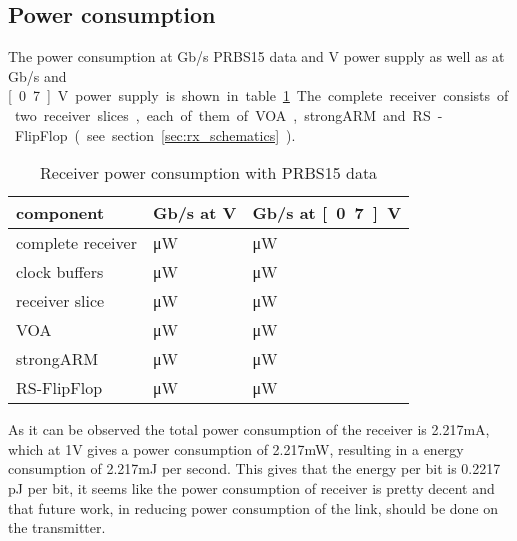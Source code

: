 \subsection{Power consumption}
The power consumption at \unit[10]{Gb/s} PRBS15 data and \unit[1]{V} power supply as well as at \unit[2]{Gb/s} and \unit[0.7]{V} power supply is shown in table \ref{tab:power_consumption_rx}. The complete receiver consists of two receiver slices, each of them of VOA, strongARM and RS-FlipFlop (see section \ref{sec:rx_schematics}).

\begin{table}[H] %
  \centering
  \begin{tabular}{l|l|l}
    component & \unit[10]{Gb/s} at \unit[1]{V} & \unit[2]{Gb/s} at \unit[0.7]{V}\\
    \hline
    complete receiver & \unit[2217]{\uW} & \unit[223]{\uW}\\
    clock buffers & \unit[1888]{\uW} & \unit[171]{\uW}\\
    receiver slice & \unit[164,67]{\uW} & \unit[25,92]{\uW}\\
    VOA & \unit[49,54]{\uW} & \unit[14,73]{\uW}\\
    strongARM & \unit[42,27]{\uW} & \unit[3,718]{\uW}\\
    RS-FlipFlop & \unit[72,86]{\uW} & \unit[7,471]{\uW}\\
  \end{tabular}
  \caption{Receiver power consumption with PRBS15 data}
  \label{tab:power_consumption_rx}
\end{table}

As it can be observed the total power consumption of the receiver is 2.217mA, which at 1V gives a power consumption of 2.217mW, resulting in a energy consumption of 2.217mJ per second. This gives that the energy per bit is 0.2217 pJ per bit, it seems like the power consumption of receiver is pretty decent and that future work, in reducing power consumption of the link, should be done on the transmitter.